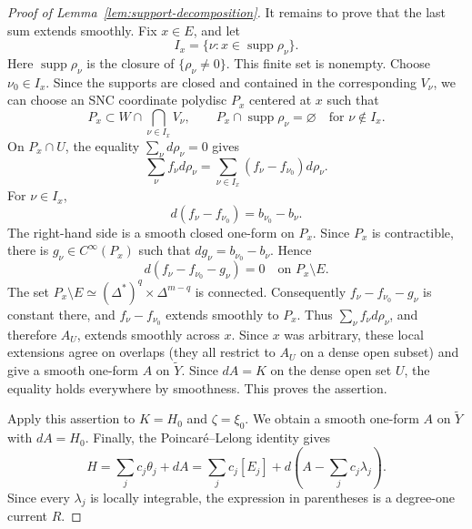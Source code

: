 \documentclass[reqno]{amsart}
\theoremstyle{plain}
\theoremstyle{remark}
\begin{document}
\begin{proof}[Proof of Lemma~\ref{lem:support-decomposition}]
It remains to prove that the last sum extends smoothly.  Fix
$x\in E$, and let
\[
 I_x=\{\nu:x\in\operatorname{supp}\rho_\nu\}.
\]
Here $\operatorname{supp}\rho_\nu$ is the closure of
$\{\rho_\nu\ne0\}$.
This finite set is nonempty.  Choose $\nu_0\in I_x$.  Since the
supports are closed and contained in the corresponding $V_\nu$, we
can choose an SNC coordinate polydisc $P_x$ centered at $x$ such
that
\[
 P_x\subset W\cap\bigcap_{\nu\in I_x}V_\nu,\qquad
 P_x\cap\operatorname{supp}\rho_\nu=\varnothing
 \quad\text{for }\nu\notin I_x.
\]
On $P_x\cap U$, the equality $\sum_\nu d\rho_\nu=0$ gives
\[
 \sum_\nu f_\nu d\rho_\nu
 =\sum_{\nu\in I_x}(f_\nu-f_{\nu_0})d\rho_\nu.
\]
For $\nu\in I_x$,
\[
 d(f_\nu-f_{\nu_0})=b_{\nu_0}-b_\nu.
\]
The right-hand side is a smooth closed one-form on $P_x$.  Since
$P_x$ is contractible, there is
$g_\nu\in C^\infty(P_x)$ such that
$dg_\nu=b_{\nu_0}-b_\nu$.  Hence
\[
 d(f_\nu-f_{\nu_0}-g_\nu)=0
 \quad\text{on }P_x\setminus E.
\]
The set $P_x\setminus E\simeq
(\Delta^*)^q\times\Delta^{m-q}$ is connected.  Consequently
$f_\nu-f_{\nu_0}-g_\nu$ is constant there, and
$f_\nu-f_{\nu_0}$ extends smoothly to $P_x$.  Thus
$\sum_\nu f_\nu d\rho_\nu$, and therefore $A_U$, extends smoothly
across $x$.  Since $x$ was arbitrary, these local extensions agree
on overlaps (they all restrict to $A_U$ on a dense open subset) and
give a smooth one-form $A$ on $\widetilde Y$. Since $dA=K$ on the
dense open set $U$, the equality holds everywhere by smoothness. This
proves the assertion.

Apply this assertion to $K=H_0$ and $\zeta=\xi_0$.  We obtain a
smooth one-form $A$ on $\widetilde Y$ with $dA=H_0$. Finally, the
Poincar\'e--Lelong identity gives
\[
 H=\sum_jc_j\theta_j+dA
  =\sum_jc_j[E_j]
   +d\left(A-\sum_jc_j\lambda_j\right).
\]
Since every $\lambda_j$ is locally integrable, the expression in
parentheses is a degree-one current $R$.

\end{proof}




\AtNextBibliography{\small}
\begingroup
\setlength\bibitemsep{2pt}
\setlength{\emergencystretch}{2em}
\printbibliography
\endgroup
\end{document}
